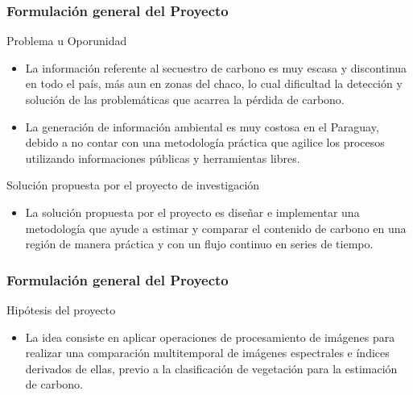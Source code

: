 \documentclass[xcolor=table]{beamer}
\begin{document}
\begin{frame}
	\frametitle{Formulaci\'on general del Proyecto}
	\begin{block}{Problema u Oporunidad}
		\begin{itemize}
			\item La informaci\'on referente al secuestro de carbono es muy escasa y discontinua en todo el pa\'is, m\'as aun en zonas del chaco, lo cual dificultad la detecci\'on y soluci\'on de las problem\'aticas que acarrea la p\'erdida de carbono.
			\item La generaci\'on de informaci\'on ambiental es muy costosa en el Paraguay, debido a no contar con una metodología pr\'actica  que agilice los procesos utilizando informaciones p\'ublicas y herramientas libres.
		\end{itemize}
	\end{block}
		\begin{block}{Soluci\'on propuesta por el proyecto de investigaci\'on}
			\begin{itemize}
				\item La soluci\'on propuesta por el proyecto es dise\~{n}ar e implementar una metodolog\'ia que ayude a estimar y comparar  el contenido de carbono en una regi\'on de manera pr\'actica y con un flujo continuo en series de tiempo.
			\end{itemize}
		\end{block}
	
\end{frame}


\begin{frame}
	\frametitle{Formulaci\'on general del Proyecto}
	\begin{block}{Hip\'otesis del proyecto}
		\begin{itemize}
			\item La idea consiste en aplicar operaciones de procesamiento de im\'agenes para realizar una comparaci\'on multitemporal de im\'agenes espectrales e \'indices derivados de ellas, previo a la clasificaci\'on de vegetaci\'on para la estimaci\'on de carbono.
		\end{itemize}
	\end{block}
	
\end{frame}
\end{document}
